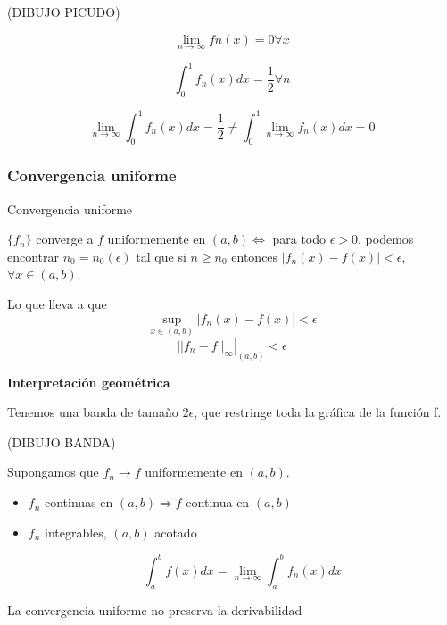 		\begin{example}{2}

		(DIBUJO PICUDO)

		\[ \lim_{n \to \infty} fn(x) = 0 \forall x \]

		\[ \int_0^1 f_n(x) dx = \frac{1}{2} \forall n \]

		\[ \lim_{n \to \infty} \int_0^1 f_n(x) dx = \frac{1}{2} \neq \int_0^1 \lim_{n \to \infty} f_n(x)  dx = 0  \]


		\end{example}


	\subsubsection{Convergencia uniforme}

		\begin{defn}{Convergencia uniforme}

			$\{f_n\}$ converge a $f$ uniformemente en $(a,b) \Leftrightarrow$ para todo $\epsilon > 0$, podemos encontrar $n_0 = n_0(\epsilon)$ tal que si $n \geq n_0$ entonces $|f_n(x) - f(x)| < \epsilon$, $\forall x \in (a,b)$.

			Lo que lleva a que \[
				\sup_{x \in (a,b)} |f_n(x) - f(x)| < \epsilon
			\]
			\[
			\left.||f_n - f||_{\infty}\right|_{(a,b)} < \epsilon
			\]

			\textbf{Interpretación geométrica}

			Tenemos una banda de tamaño $2\epsilon$, que restringe toda la gráfica de la función f.

			(DIBUJO BANDA)

		\end{defn}

		\begin{theorem}

			Supongamos que $f_n \rightarrow f$ uniformemente en $(a,b)$.

			\begin{itemize}
				\item $f_n$ continuas en $(a,b) \Rightarrow f$ continua en $(a,b)$

				\item $f_n$ integrables, $(a,b)$ acotado

				\[\int^{b}_{a} f(x) dx = \lim_{n \rightarrow \infty} \int^{b}_{a} f_n(x) dx \]
			\end{itemize}

			\obs La convergencia uniforme no preserva la derivabilidad

		\end{theorem}

